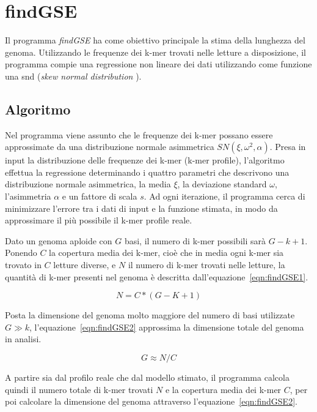 \documentclass[crop=false, class=book]{standalone}
\begin{document}
	\chapter{findGSE}
	
	Il programma \textit{findGSE} \cite{sun2017findGSE} ha come obiettivo principale la stima della lunghezza del genoma. Utilizzando le frequenze dei k-mer trovati nelle letture a disposizione, il programma compie una regressione non lineare dei dati utilizzando come funzione una \gls{snd} (\textit{skew normal distribution} \cite{azzalini1985class,azzalini2005skew}).
	
	
	\section{Algoritmo}
	Nel programma viene assunto che le frequenze dei k-mer possano essere approssimate da una distribuzione normale asimmetrica $SN(\xi, \omega^2, \alpha)$. Presa in input la distribuzione delle frequenze dei k-mer (k-mer profile), l'algoritmo effettua la regressione determinando i quattro parametri che descrivono una distribuzione normale asimmetrica, la media $\xi$, la deviazione standard $\omega$, l'asimmetria $\alpha$ e un fattore di scala $s$. Ad ogni iterazione, il programma cerca di minimizzare l'errore tra i dati di input e la funzione stimata, in modo da approssimare il più possibile il k-mer profile reale. 
	
	Dato un genoma aploide con $G$ basi, il numero di k-mer possibili sarà $G-k+1$. Ponendo $C$ la copertura media dei k-mer, cioè che in media ogni k-mer sia trovato in $C$ letture diverse, e $N$ il numero di k-mer trovati nelle letture, la quantità di k-mer presenti nel genoma è descritta dall'equazione~\vref{eqn:findGSE1}. 	
	
	\begin{equation}
		\label{eqn:findGSE1}
		N=C*(G-K+1)
	\end{equation}
		
	
	Posta la dimensione del genoma molto maggiore del numero di basi utilizzate $G\gg k$, l'equazione~\vref{eqn:findGSE2} approssima la dimensione totale del genoma in analisi.
	
	\begin{equation}
		\label{eqn:findGSE2}
		G\approx N/C
	\end{equation}

	A partire sia dal profilo reale che dal modello stimato, il programma calcola quindi il numero totale di k-mer trovati $N$ e la copertura media dei k-mer $C$, per poi calcolare la dimensione del genoma attraverso l'equazione~\vref{eqn:findGSE2}.
	

	

	
	
	
\end{document}
